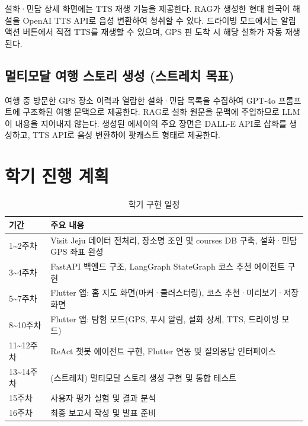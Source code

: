 \documentclass[10pt,twocolumn,a4paper]{article}
\begin{document}
설화·민담 상세 화면에는 TTS 재생 기능을 제공한다. RAG가 생성한 현대 한국어
해설을 OpenAI TTS API로 음성 변환하여 청취할 수 있다. 드라이빙 모드에서는
알림 액션 버튼에서 직접 TTS를 재생할 수 있으며, GPS 핀 도착 시 해당 설화가
자동 재생된다.

\subsection{멀티모달 여행 스토리 생성 (스트레치 목표)}

여행 중 방문한 GPS 장소 이력과 열람한 설화·민담 목록을 수집하여 GPT-4o
프롬프트에 구조화된 여행 문맥으로 제공한다. RAG로 설화 원문을 문맥에
주입하므로 LLM이 내용을 지어내지 않는다. 생성된 에세이의 주요 장면은 DALL-E
API로 삽화를 생성하고, TTS API로 음성 변환하여 팟캐스트 형태로 제공한다.

\section{학기 진행 계획}

\begin{table}[H]
\centering
\caption{학기 구현 일정}
\small
\begin{tabularx}{\columnwidth}{@{}lX@{}}
\toprule
\textbf{기간} & \textbf{주요 내용} \\
\midrule
1\textasciitilde2주차 & Visit Jeju 데이터 전처리, 장소명 조인 및 courses DB 구축, 설화·민담 GPS 좌표 완성 \\
3\textasciitilde4주차 & FastAPI 백엔드 구조, LangGraph StateGraph 코스 추천 에이전트 구현 \\
5\textasciitilde7주차 & Flutter 앱: 홈 지도 화면(마커·클러스터링), 코스 추천·미리보기·저장 화면 \\
8\textasciitilde10주차 & Flutter 앱: 탐험 모드(GPS, 푸시 알림, 설화 상세, TTS, 드라이빙 모드) \\
11\textasciitilde12주차 & ReAct 챗봇 에이전트 구현, Flutter 연동 및 질의응답 인터페이스 \\
13\textasciitilde14주차 & (스트레치) 멀티모달 스토리 생성 구현 및 통합 테스트 \\
15주차 & 사용자 평가 실험 및 결과 분석 \\
16주차 & 최종 보고서 작성 및 발표 준비 \\
\bottomrule
\end{tabularx}
\end{table}

\end{document}
